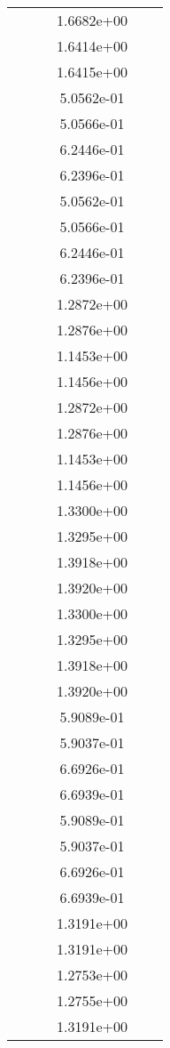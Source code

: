 \begin{xltabular}{\textwidth}{r|rS[table-format=1.3e+2]S[table-format=1.4e+2]S[table-format=1.4e+2]S[table-format=-1.5]}
&  &  & 1.6682e+00 & & \\
&  &  & 1.6414e+00 & & \\
&  &  & 1.6415e+00 & & \\
&  &  & 5.0562e-01 & & \\
&  &  & 5.0566e-01 & & \\
&  &  & 6.2446e-01 & & \\
&  &  & 6.2396e-01 & & \\
&  &  & 5.0562e-01 & & \\
&  &  & 5.0566e-01 & & \\
&  &  & 6.2446e-01 & & \\
&  &  & 6.2396e-01 & & \\
&  &  & 1.2872e+00 & & \\
&  &  & 1.2876e+00 & & \\
&  &  & 1.1453e+00 & & \\
&  &  & 1.1456e+00 & & \\
&  &  & 1.2872e+00 & & \\
&  &  & 1.2876e+00 & & \\
&  &  & 1.1453e+00 & & \\
&  &  & 1.1456e+00 & & \\
&  &  & 1.3300e+00 & & \\
&  &  & 1.3295e+00 & & \\
&  &  & 1.3918e+00 & & \\
&  &  & 1.3920e+00 & & \\
&  &  & 1.3300e+00 & & \\
&  &  & 1.3295e+00 & & \\
&  &  & 1.3918e+00 & & \\
&  &  & 1.3920e+00 & & \\
&  &  & 5.9089e-01 & & \\
&  &  & 5.9037e-01 & & \\
&  &  & 6.6926e-01 & & \\
&  &  & 6.6939e-01 & & \\
&  &  & 5.9089e-01 & & \\
&  &  & 5.9037e-01 & & \\
&  &  & 6.6926e-01 & & \\
&  &  & 6.6939e-01 & & \\
&  &  & 1.3191e+00 & & \\
&  &  & 1.3191e+00 & & \\
&  &  & 1.2753e+00 & & \\
&  &  & 1.2755e+00 & & \\
&  &  & 1.3191e+00 & & \\

\end{xltabular}
